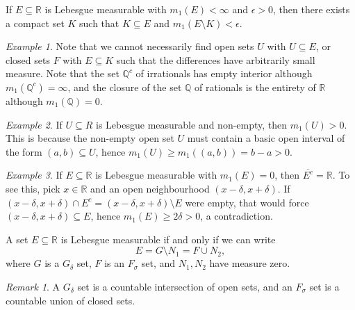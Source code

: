 \documentclass[11pt]{article}
\newcommand{\R}{\mathbb{R}}
\newcommand{\Q}{\mathbb{Q}}
\theoremstyle{definition}
\theoremstyle{remark}
\newtheorem*{remark}{Remark}
\newtheorem*{example}{Example}
\numberwithin{equation}{section}
\begin{document}
    \begin{corollary}
        If $E \subseteq \R$ is Lebesgue measurable with $m_1(E) < \infty$ and
        $\epsilon > 0$, then there exists a compact set $K$ such that $K \subseteq E$
        and $m_1(E \setminus K) < \epsilon$.
    \end{corollary}

    \begin{example}
        Note that we cannot necessarily find open sets $U$ with $U \subseteq E$, or
        closed sets $F$ with $E \subseteq K$ such that the differences have
        arbitrarily small measure. Note that the set $\Q^c$ of irrationals has empty
        interior although $m_1(\Q^c) = \infty$, and the closure of the set $\Q$ of
        rationals is the entirety of $\R$ although $m_1(\Q) = 0$.
    \end{example}

    \begin{example}
        If $U \subseteq R$ is Lebesgue measurable and non-empty, then $m_1(U) > 0$.
        This is because the non-empty open set $U$ must contain a basic open interval
        of the form $(a, b) \subseteq U$, hence $m_1(U) \geq m_1((a, b)) = b - a >
        0$.
    \end{example}

    \begin{example}
        If $E \subseteq \R$ is Lebesgue measurable with $m_1(E) = 0$, then
        $\overline{E^c} = \R$. To see this, pick $x \in \R$ and an open neighbourhood
        $(x - \delta, x + \delta)$. If $(x - \delta, x + \delta) \cap E^c = (x -
        \delta, x + \delta)\setminus E$ were empty, that would force $(x - \delta, x
        + \delta) \subseteq E$, hence $m_1(E) \geq 2\delta > 0$, a contradiction.
    \end{example}

    \begin{theorem}
        A set $E \subseteq \R$ is Lebesgue measurable if and only if we can write \[
            E = G \setminus N_1 = F \cup N_2,
        \] where $G$ is a $G_\delta$ set, $F$ is an $F_\sigma$ set, and $N_1, N_2$
        have measure zero.

        \begin{remark}
            A $G_\delta$ set is a countable intersection of open sets, and an
            $F_\sigma$ set is a countable union of closed sets.
        \end{remark}
    \end{theorem}
\end{document}

